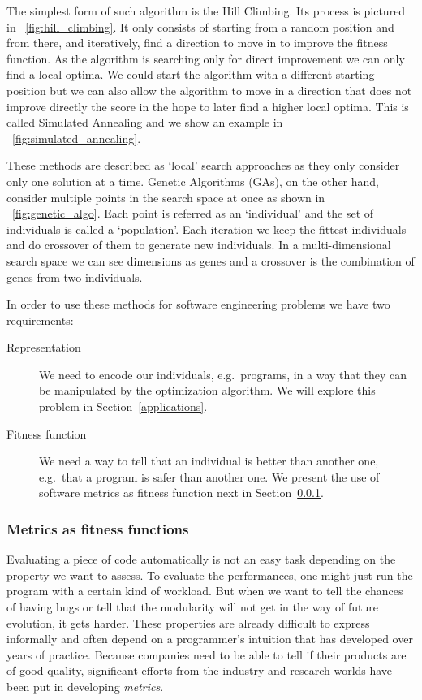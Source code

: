 \documentclass[11pt]{sdm}
\begin{document}
The simplest form of such algorithm is the Hill Climbing.
Its process is pictured in \figurename~\ref{fig:hill_climbing}.
It only consists of starting from a random position and from there, and iteratively, find a direction to move in to improve the fitness function.
As the algorithm is searching only for direct improvement we can only find a local optima.
We could start the algorithm with a different starting position but we can also allow the algorithm to move in a direction that does not improve directly the score in the hope to later find a higher local optima.
This is called Simulated Annealing and we show an example in \figurename~\ref{fig:simulated_annealing}.

These methods are described as `local' search approaches as they only consider only one solution at a time.
Genetic Algorithms (GAs), on the other hand, consider multiple points in the search space at once as shown in \figurename~\ref{fig:genetic_algo}.
Each point is referred as an `individual' and the set of individuals is called a `population'.
Each iteration we keep the fittest individuals and do crossover of them to generate new individuals.
In a multi-dimensional search space we can see dimensions as genes and a crossover is the combination of genes from two individuals.

In order to use these methods for software engineering problems we have two requirements:
\begin{description}
  \item[Representation] We need to encode our individuals, e.g.\ programs, in a way that they can be manipulated by the optimization algorithm. We will explore this problem in Section~\ref{applications}.
  \item[Fitness function] We need a way to tell that an individual is better than another one, e.g.\ that a program is safer than another one. We present the use of software metrics as fitness function next in Section~\ref{fitness_func}.
\end{description}

\subsubsection{Metrics as fitness functions}
\label{fitness_func}
Evaluating a piece of code automatically is not an easy task depending on the property we want to assess.
To evaluate the performances, one might just run the program with a certain kind of workload.
But when we want to tell the chances of having bugs or tell that the modularity will not get in the way of future evolution, it gets harder.
These properties are already difficult to express informally and often depend on a programmer's intuition that has developed over years of practice.
Because companies need to be able to tell if their products are of good quality, significant efforts from the industry and research worlds have been put in developing \textit{metrics}.
\end{document}
